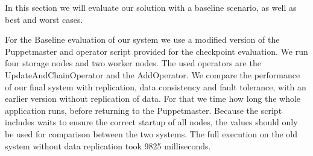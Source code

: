 \documentclass[times, 10pt,twocolumn]{article}
\begin{document}
In this section we will evaluate our solution with a baseline scenario, as well as best and worst cases.

For the Baseline evaluation of our system we use a modified version of the Puppetmaster and operator script provided for the checkpoint evaluation. 
We run four storage nodes and two worker nodes.
The used operators are the UpdateAndChainOperator and the AddOperator.
We compare the performance of our final system with replication, data consistency and fault tolerance, with an earlier version without replication of data.
For that we time how long the whole application runs, before returning to the Puppetmaster.
Because the script includes waits to ensure the correct startup of all nodes, the values should only be used for comparison between the two systems.
The full execution on the old system without data replication took 9825 milliseconds.





\nocite{ex1,ex2}


\end{document}
